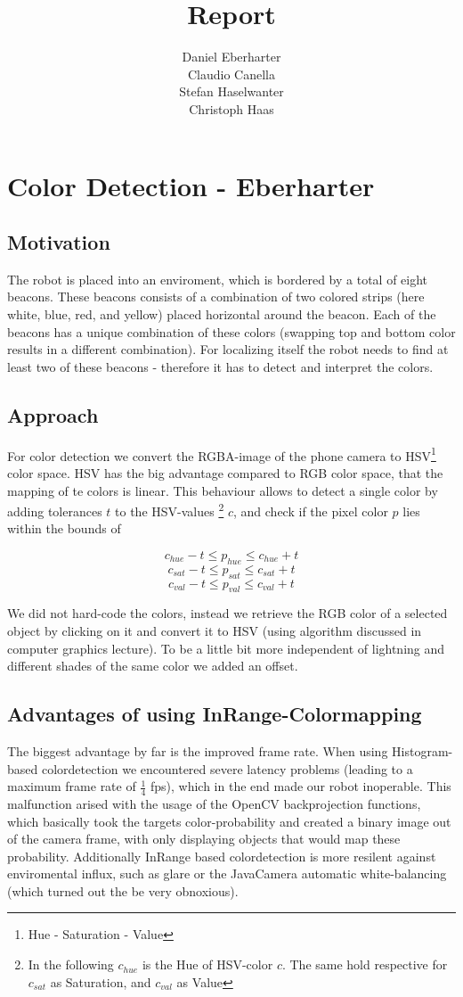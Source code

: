 \documentclass[703031]{iisreport}
\title{Report}
\author{Daniel Eberharter\\ Claudio Canella\\ Stefan Haselwanter\\ Christoph Haas}
\begin{document}
\maketitle

\section{Color Detection - Eberharter}
\subsection{Motivation}
The robot is placed into an enviroment, which is bordered by a total of eight beacons. These beacons consists of a combination of two colored strips (here white, blue, red, and yellow) placed horizontal around the beacon. Each of the beacons has a unique combination of these colors (swapping top and bottom color results in a different combination).
For localizing itself the robot needs to find at least two of these beacons - therefore it has to detect and interpret the colors.
\subsection{Approach}
For color detection we convert the RGBA-image of the phone camera to HSV\footnote{Hue - Saturation - Value} color space. HSV has the big advantage compared to RGB color space, that the mapping of te colors is linear. This behaviour allows to detect a single color by adding tolerances $t$ to the HSV-values \footnote{In the following $c_{hue}$ is the Hue of HSV-color $c$. The same hold respective for $c_{sat}$ as Saturation, and $c_{val}$ as Value} $c$, and check if the pixel color $p$ lies within the bounds of 

\[c_{hue} - t \le p_{hue} \le c_{hue} + t\]
\[c_{sat} - t \le p_{sat} \le c_{sat} + t\]
\[c_{val} - t \le p_{val} \le c_{val} + t\]


We did not hard-code the colors, instead we retrieve the RGB color of a selected object by clicking on it and convert it to HSV (using algorithm discussed in computer graphics lecture). To be a little bit more independent of lightning and different shades of the same color we added an offset.

\subsection{Advantages of using InRange-Colormapping}
The biggest advantage by far is the improved frame rate. When using Histogram-based colordetection we encountered severe latency problems (leading to a maximum frame rate of $\frac{1}{4}$ fps), which in the end made our robot inoperable. This malfunction arised with the usage of the OpenCV backprojection functions, which basically took the targets color-probability and created a binary image out of the camera frame, with only displaying objects that would map these probability.
Additionally InRange based colordetection is more resilent against enviromental influx, such as glare or the JavaCamera automatic white-balancing (which turned out the be very obnoxious).
\end{document}
